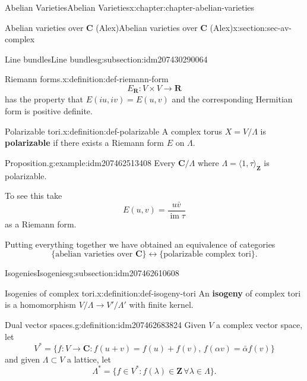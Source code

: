 \documentclass[oneside,10pt,]{book}
\newcommand{\terminology}[1]{\textbf{#1}}
\numberwithin{equation}{section}
\newcommand{\ZZ}{\mathbf{Z}}
\newcommand{\RR}{\mathbf{R}}
\newcommand{\CC}{\mathbf{C}}
\DeclareMathOperator{\im}{im}
\begin{document}
\begin{chapterptx}{Abelian Varieties}{}{Abelian Varieties}{}{}{x:chapter:chapter-abelian-varieties}
\begin{sectionptx}{Abelian varieties over \(\CC\) (Alex)}{}{Abelian varieties over \(\CC\) (Alex)}{}{}{x:section:sec-av-complex}
\begin{subsectionptx}{Line bundles}{}{Line bundles}{}{}{g:subsection:idm207430290064}
\begin{definition}{Riemann forms.}{x:definition:def-riemann-form}
\begin{equation*}
E_\RR \colon V\times V\to \RR
\end{equation*}
has the property that \(E(iu,iv) = E(u,v)\) and  the corresponding Hermitian form is positive definite.%
\end{definition}
\begin{definition}{Polarizable tori.}{x:definition:def-polarizable}%
A complex torus \(X = V/\Lambda\) is \terminology{polarizable} if there exists a Riemann form \(E\) on \(\Lambda\).%
\end{definition}
\begin{example}{Proposition.}{g:example:idm207462513408}%
Every \(\CC/\Lambda\) where \(\Lambda = \langle 1,\tau\rangle_{\ZZ}\) is polarizable.%
\par
To see this take%
\begin{equation*}
E(u,v) = \frac{u\bar v}{\im \tau}
\end{equation*}
as a Riemann form.%
\end{example}
Putting everything together we have obtained an equivalence of categories%
\begin{equation*}
\{\text{abelian varieties over } \CC\} \leftrightarrow \{\text{polarizable complex tori}\}\text{.}
\end{equation*}
%
\end{subsectionptx}
%
%
\typeout{************************************************}
\typeout{************************************************}
%
\begin{subsectionptx}{Isogenies}{}{Isogenies}{}{}{g:subsection:idm207462610608}
\begin{definition}{Isogenies of complex tori.}{x:definition:def-isogeny-tori}%
An \terminology{isogeny} of complex tori is a homomorphism \(V/\Lambda \to V'/\Lambda'\) with finite kernel.%
\end{definition}
\begin{definition}{Dual vector spaces.}{g:definition:idm207462683824}%
Given \(V\) a complex vector space, let%
\begin{equation*}
V^* = \{f\colon V\to \CC : f(u+v) = f(u)+f(v),\,f(\alpha v) = \bar \alpha f(v) \}
\end{equation*}
and given \(\Lambda \subset V\) a lattice, let%
\begin{equation*}
\Lambda^* = \{f\in V^* : f(\lambda) \in \ZZ\,\forall \lambda\in \Lambda\}\text{.}
\end{equation*}
%
\end{definition}

\end{subsectionptx}
\end{sectionptx}
\end{chapterptx}
\end{document}
